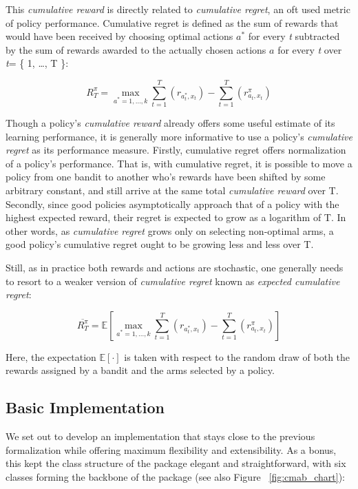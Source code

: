 \documentclass[nojss]{jss}\usepackage[]{graphicx}\usepackage[]{color}
\begin{document}
This \textit{cumulative reward} is directly related to \textit{cumulative regret}, an oft used metric of policy performance. Cumulative regret is defined as the sum of rewards that would have been received by choosing optimal actions $a^{*}$ for every \emph{t} subtracted by the sum of rewards awarded to the actually chosen actions $a$ for every \emph{t} over \emph{t}= \{ 1, \ldots, T \}:

\begin{equation} \label{eq:2}
R^{\pi}_{T} = \max_{a^{*}= 1, \dots, k} \sum^{T}_{t=1}(r_{a^{*}_t,x_t}) - \sum^{T}_{t=1}(r^{\pi}_{a_t,x_t})
\end{equation}

Though a policy's \textit{cumulative reward} already offers some useful estimate of its learning performance, it is generally more informative to use a policy's \textit{cumulative regret} as its performance measure. Firstly, cumulative regret offers normalization of a policy's performance. That is, with cumulative regret, it is possible to move a policy from one bandit to another who's rewards have been shifted by some arbitrary constant, and still arrive at the same total \textit{cumulative reward} over T. Secondly, since good policies asymptotically approach that of a policy with the highest expected reward, their regret is expected to grow as a logarithm of T. In other words, as \textit{cumulative regret} grows only on selecting non-optimal arms, a good policy's cumulative regret ought to be growing less and less over T.

Still, as in practice both rewards and actions are stochastic, one generally needs to resort to a weaker version of \textit{cumulative regret} known as \textit{expected cumulative regret}:

\begin{equation} \label{eq:3}
\overline{R^{\pi}_{T} } = \mathbb{E}\left[  \max_{a^{*}= 1, \dots, k} \sum^{T}_{t=1}(r_{a^{*}_t,x_t}) - \sum^{T}_{t=1}(r^{\pi}_{a_t,x_t})\right]
\end{equation}

Here, the expectation $\mathbb{E}\left[ \mathord{\cdot}\right]$ is taken with respect to the random draw of both the rewards assigned by a bandit and the arms selected by a policy.

\subsection{Basic Implementation}

We set out to develop an implementation that stays close to the previous formalization while offering maximum flexibility and extensibility. As a bonus, this kept the class structure of the package elegant and straightforward, with six classes forming the backbone of the package (see also Figure ~\ref{fig:cmab_chart}):
\end{document}
